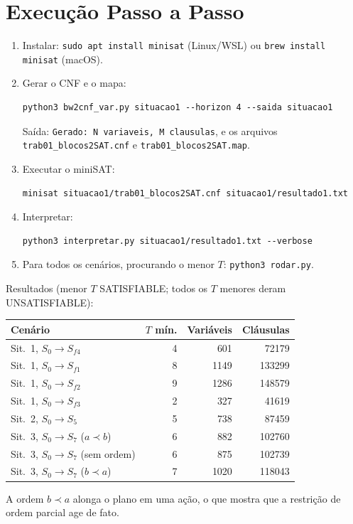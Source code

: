 \documentclass[11pt,a4paper]{article}
\begin{document}
\section{Execu\c{c}\~ao Passo a Passo}
\begin{enumerate}
\item Instalar: \texttt{sudo apt install minisat} (Linux/WSL) ou \texttt{brew install minisat} (macOS).
\item Gerar o CNF e o mapa:
\begin{lstlisting}
python3 bw2cnf_var.py situacao1 --horizon 4 --saida situacao1
\end{lstlisting}
Sa\'ida: \texttt{Gerado: N variaveis, M clausulas}, e os arquivos \texttt{trab01\_blocos2SAT.cnf} e \texttt{trab01\_blocos2SAT.map}.
\item Executar o miniSAT:
\begin{lstlisting}
minisat situacao1/trab01_blocos2SAT.cnf situacao1/resultado1.txt
\end{lstlisting}
\item Interpretar:
\begin{lstlisting}
python3 interpretar.py situacao1/resultado1.txt --verbose
\end{lstlisting}
\item Para todos os cen\'arios, procurando o menor $T$: \texttt{python3 rodar.py}.
\end{enumerate}
Resultados (menor $T$ SATISFIABLE; todos os $T$ menores deram UNSATISFIABLE):
\begin{center}
\begin{tabular}{lrrr}
\toprule
Cen\'ario & $T$ m\'in. & Vari\'aveis & Cl\'ausulas\\
\midrule
Sit.\ 1, $S_0\to S_{f4}$ & 4 & 601 & 72179\\
Sit.\ 1, $S_0\to S_{f1}$ & 8 & 1149 & 133299\\
Sit.\ 1, $S_0\to S_{f2}$ & 9 & 1286 & 148579\\
Sit.\ 1, $S_0\to S_{f3}$ & 2 & 327 & 41619\\
Sit.\ 2, $S_0\to S_5$ & 5 & 738 & 87459\\
Sit.\ 3, $S_0\to S_7$ ($a\prec b$) & 6 & 882 & 102760\\
Sit.\ 3, $S_0\to S_7$ (sem ordem) & 6 & 875 & 102739\\
Sit.\ 3, $S_0\to S_7$ ($b\prec a$) & 7 & 1020 & 118043\\
\bottomrule
\end{tabular}
\end{center}
A ordem $b\prec a$ alonga o plano em uma a\c{c}\~ao, o que mostra que a restri\c{c}\~ao de ordem parcial age de fato.
\end{document}
